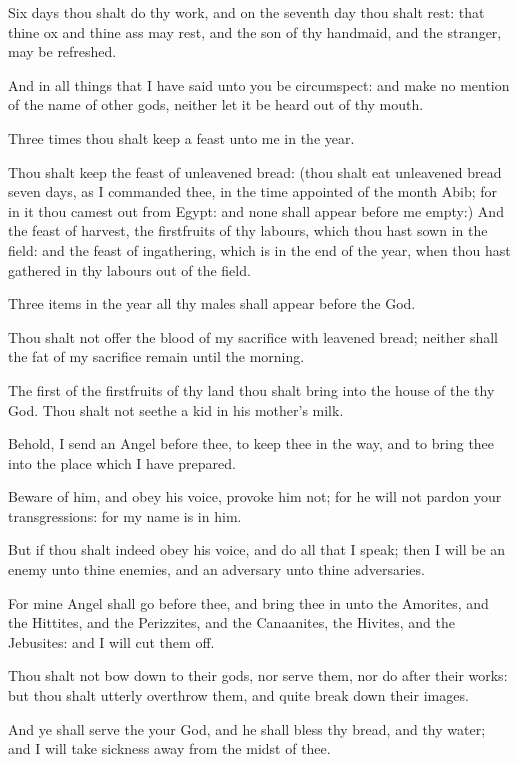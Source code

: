 \Verse Six days thou shalt do thy work, and on the seventh day thou shalt rest: that thine ox and thine ass may rest, and the son of thy handmaid, and the stranger, may be refreshed.

\Verse And in all things that I have said unto you be circumspect: and make no mention of the name of other gods, neither let it be heard out of thy mouth.

\Verse Three times thou shalt keep a feast unto me in the year.

\Verse Thou shalt keep the feast of unleavened bread: (thou shalt eat unleavened bread seven days, as I commanded thee, in the time appointed of the month Abib; for in it thou camest out from Egypt: and none shall appear before me empty:) \Verse And the feast of harvest, the firstfruits of thy labours, which thou hast sown in the field: and the feast of ingathering, which is in the end of the year, when thou hast gathered in thy labours out of the field.

\Verse Three items in the year all thy males shall appear before the \LORD God.

\Verse Thou shalt not offer the blood of my sacrifice with leavened bread; neither shall the fat of my sacrifice remain until the morning.

\Verse The first of the firstfruits of thy land thou shalt bring into the house of the \LORD thy God. Thou shalt not seethe a kid in his mother's milk.

\Verse Behold, I send an Angel before thee, to keep thee in the way, and to bring thee into the place which I have prepared.

\Verse Beware of him, and obey his voice, provoke him not; for he will not pardon your transgressions: for my name is in him.

\Verse But if thou shalt indeed obey his voice, and do all that I speak; then I will be an enemy unto thine enemies, and an adversary unto thine adversaries.

\Verse For mine Angel shall go before thee, and bring thee in unto the Amorites, and the Hittites, and the Perizzites, and the Canaanites, the Hivites, and the Jebusites: and I will cut them off.

\Verse Thou shalt not bow down to their gods, nor serve them, nor do after their works: but thou shalt utterly overthrow them, and quite break down their images.

\Verse And ye shall serve the \LORD your God, and he shall bless thy bread, and thy water; and I will take sickness away from the midst of thee.

